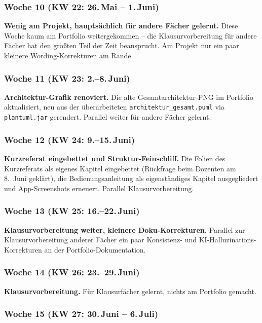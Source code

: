 \documentclass[12pt, a4paper, ngerman]{article}
\newcommand{\code}[1]{\texttt{#1}}
\newcommand{\datei}[1]{\texttt{\small #1}}
\begin{document}
\subsubsection*{Woche 10 (KW 22: 26.\,Mai -- 1.\,Juni)}

\textbf{Wenig am Projekt, hauptsächlich für andere Fächer gelernt.}
Diese Woche kaum am Portfolio weitergekommen -- die
Klausurvorbereitung für andere Fächer hat den größten Teil der Zeit
beansprucht. Am Projekt nur ein paar kleinere Wording-Korrekturen
am Rande.

\subsubsection*{Woche 11 (KW 23: 2.--8.\,Juni)}

\textbf{Architektur-Grafik renoviert.}
Die alte Gesamtarchitektur-PNG im Portfolio aktualisiert, neu aus
der überarbeiteten \datei{architektur\_gesamt.puml} via
\code{plantuml.jar} gerendert. Parallel weiter für andere Fächer
gelernt.

\subsubsection*{Woche 12 (KW 24: 9.--15.\,Juni)}

\textbf{Kurzreferat eingebettet und Struktur-Feinschliff.}
Die Folien des Kurzreferats als eigenes Kapitel eingebettet
(Rückfrage beim Dozenten am 8.~Juni geklärt), die
Bedienungsanleitung als eigenständiges Kapitel ausgegliedert und
App-Screenshots erneuert. Parallel Klausurvorbereitung.

\subsubsection*{Woche 13 (KW 25: 16.--22.\,Juni)}

\textbf{Klausurvorbereitung weiter, kleinere Doku-Korrekturen.}
Parallel zur Klausurvorbereitung anderer Fächer ein paar Konsistenz-
und KI-Halluzinations-Korrekturen an der Portfolio-Dokumentation.

\subsubsection*{Woche 14 (KW 26: 23.--29.\,Juni)}

\textbf{Klausurvorbereitung.}
Für Klausurfächer gelernt, nichts am Portfolio gemacht.

\subsubsection*{Woche 15 (KW 27: 30.\,Juni -- 6.\,Juli)}
\end{document}
